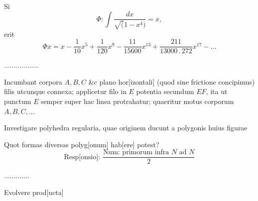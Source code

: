 \ClosingRule
\clearpage
{}
\noindent\hspace*{\parindent}Si
\[\Phi:\int\frac{dx}{\surd(1-x^4)}=x,\]
\noindent erit
\[\Phi x=x-\frac1{10}x^5+\frac1{120}x^9-\frac{11}{15600}x^{13}+\frac{211}{13000\mathpunct{.}272}x^{17}-\ldots\]
\begin{center}.\quad .\quad .\quad .\quad .\quad .\quad .\quad .\quad .\quad .\quad .\quad .\quad .\quad .\quad .\quad .\quad .\quad .\end{center}
\ClosingRule
{}
\noindent\hspace*{\parindent}Incumbant corpora $A,B,C$ \&c plano hor[izontali] (quod sine frictione
concipimus) filis utcunque connexa; applicetur filo in $E$ potentia secundum
$EF$, ita ut punctum $E$ semper super hac linea protrahatur; quaeritur motus
corporum $A,B,C,\ldots$
\begin{center}
\end{center}
\ClosingRule
{}
\noindent\hspace*{\parindent}Investigare polyhedra regularia, quae originem ducunt a polygonis huius
figurae
\clearpage
{}
\begin{center}
\end{center}
\noindent Quot formas diversas polyg[onum] hab[ere] potest?
\[\text{Resp[onsio]: }\frac{\text{Num: primorum infra }N\text{ ad }N}{2}\]
\begin{center}.\quad .\quad .\quad .\quad .\quad .\quad .\quad .\quad .\quad .\quad .\quad .\quad .\end{center}
\ClosingRule
{}
\noindent\hspace*{\parindent}Evolvere prod[ucta]
